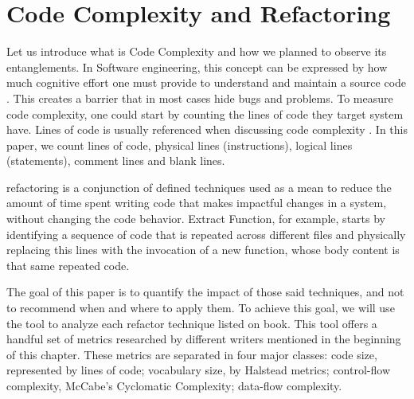 \section{Code Complexity and Refactoring}

Let us introduce what is Code Complexity and how we planned to observe its entanglements.
In Software engineering, this concept can be expressed by how much cognitive effort one must provide
to understand and maintain a source code \cite{article:fmricc}. This creates a barrier that in most cases
hide bugs and problems.
To measure code complexity, one could start by counting the lines of code they target system have.
Lines of code is usually referenced when discussing code complexity \cite{article:rustcc}.
In this paper, we count lines of code, physical lines (instructions), logical lines (statements), comment lines and
blank lines.


\cite{book:refactoring} refactoring is a conjunction of defined techniques used as a mean to reduce the amount of
time spent writing code that makes impactful changes in a system, without changing the code behavior. Extract Function,
for example, starts by identifying a sequence of code that is repeated across different files and physically replacing
this lines with the invocation of a new function, whose body content is that same repeated code.


The goal of this paper is to quantify the impact of those said techniques, and not to recommend when and where to apply them.
To achieve this goal, we will use the \cite{article:mozilla} tool to analyze each refactor technique listed on
\cite{book:refactoring} book. This tool offers a handful set of metrics researched by
different writers mentioned in the beginning of this chapter. These metrics are separated in four major classes: code size,
represented by lines of code; vocabulary size, by Halstead metrics; control-flow complexity, McCabe's Cyclomatic
Complexity; data-flow complexity.
